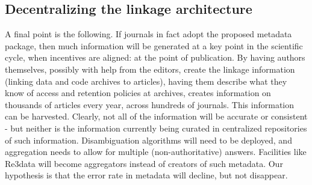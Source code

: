 \subsection{Decentralizing the linkage architecture}
A final point is the following. If journals in fact adopt the proposed metadata package, then much information will be generated at a key point in the scientific cycle, when incentives are aligned: at the point of publication. By having authors themselves, possibly with help from the editors, create the linkage information (linking data and code archives to articles), having them describe what they know of access and retention policies at archives, creates information on thousands of articles every year, across hundreds of journals. This information can be harvested. Clearly, not all of the information will be accurate or consistent - but neither is the information currently being curated in centralized repositories of such information. Disambiguation algorithms will need to be deployed, and aggregation needs to allow for multiple (non-authoritative) answers. Facilities like Re3data will become aggregators instead of creators of such metadata. Our hypothesis is that the error rate in metadata will decline, but not disappear. 